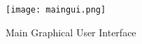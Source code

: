 
\begin{figure}[h]
	\texttt{[image: maingui.png]}
	\caption{Main Graphical User Interface}
\end{figure}
